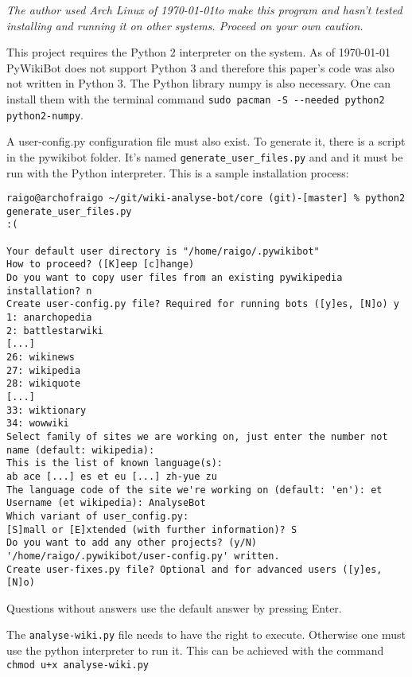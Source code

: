 \emph{The author used Arch Linux of \today to make this program and hasn't
tested installing and running it on other systems. Proceed on your own caution.}

This project requires the Python 2 interpreter on the system. As of \today
PyWikiBot does not support Python 3 and therefore this paper's code was also not
written in Python 3. The Python library numpy is also necessary.
One can install them with the terminal command 
\verb;sudo pacman -S --needed python2 python2-numpy;.

A user-config.py configuration file must also exist. To generate it, there is a
script in the pywikibot folder. It's named \verb;generate_user_files.py; and and
it must be run with the Python interpreter. This is a sample installation
process:
\begin{verbatim}
raigo@archofraigo ~/git/wiki-analyse-bot/core (git)-[master] % python2 generate_user_files.py                                                                               :(

Your default user directory is "/home/raigo/.pywikibot"
How to proceed? ([K]eep [c]hange) 
Do you want to copy user files from an existing pywikipedia installation? n
Create user-config.py file? Required for running bots ([y]es, [N]o) y
1: anarchopedia
2: battlestarwiki
[...]
26: wikinews
27: wikipedia
28: wikiquote
[...]
33: wiktionary
34: wowwiki
Select family of sites we are working on, just enter the number not name (default: wikipedia): 
This is the list of known language(s):
ab ace [...] es et eu [...] zh-yue zu
The language code of the site we're working on (default: 'en'): et
Username (et wikipedia): AnalyseBot
Which variant of user_config.py:
[S]mall or [E]xtended (with further information)? S
Do you want to add any other projects? (y/N)
'/home/raigo/.pywikibot/user-config.py' written.
Create user-fixes.py file? Optional and for advanced users ([y]es, [N]o) 
\end{verbatim}
Questions without answers use the default answer by pressing Enter.

The \verb;analyse-wiki.py; file needs to have the right to execute. Otherwise
one must use the python interpreter to run it. This can be achieved with the
command \verb;chmod u+x analyse-wiki.py;
